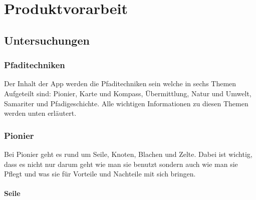 \chapter{Produktvorarbeit}
\section{Untersuchungen}
\subsection{Pfaditechniken}

Der Inhalt der App werden die Pfaditechniken sein welche in sechs Themen Aufgeteilt sind: Pionier, Karte und Kompass, Übermittlung, Natur und Umwelt, Samariter und Pfadigeschichte. Alle wichtigen Informationen zu diesen Themen werden unten erläutert.

\subsection*{Pionier}

Bei Pionier geht es rund um Seile, Knoten, Blachen und Zelte. Dabei ist wichtig, dass es nicht nur darum geht wie man sie benutzt sondern auch wie man sie Pflegt und was sie für Vorteile und Nachteile mit sich bringen.

\subsubsection*{Seile}

